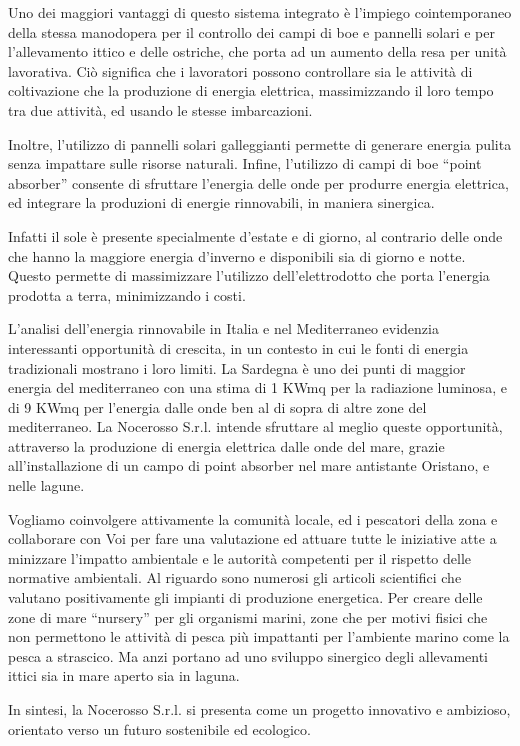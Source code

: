 \documentclass[
  onecolumn]{report}
\begin{document}
Uno dei maggiori vantaggi di questo sistema integrato è l'impiego
cointemporaneo della stessa manodopera per il controllo dei campi di boe
e pannelli solari e per l'allevamento ittico e delle ostriche, che porta
ad un aumento della resa per unità lavorativa. Ciò significa che i
lavoratori possono controllare sia le attività di coltivazione che la
produzione di energia elettrica, massimizzando il loro tempo tra due
attività, ed usando le stesse imbarcazioni.

Inoltre, l'utilizzo di pannelli solari galleggianti permette di generare
energia pulita senza impattare sulle risorse naturali. Infine,
l'utilizzo di campi di boe ``point absorber'' consente di sfruttare
l'energia delle onde per produrre energia elettrica, ed integrare la
produzioni di energie rinnovabili, in maniera sinergica.

Infatti il sole è presente specialmente d'estate e di giorno, al
contrario delle onde che hanno la maggiore energia d'inverno e
disponibili sia di giorno e notte. Questo permette di massimizzare
l'utilizzo dell'elettrodotto che porta l'energia prodotta a terra,
minimizzando i costi.

L'analisi dell'energia rinnovabile in Italia e nel Mediterraneo
evidenzia interessanti opportunità di crescita, in un contesto in cui le
fonti di energia tradizionali mostrano i loro limiti. La Sardegna è uno
dei punti di maggior energia del mediterraneo con una stima di 1 KWmq
per la radiazione luminosa, e di 9 KWmq per l'energia dalle onde ben al
di sopra di altre zone del mediterraneo. La Nocerosso S.r.l. intende
sfruttare al meglio queste opportunità, attraverso la produzione di
energia elettrica dalle onde del mare, grazie all'installazione di un
campo di point absorber nel mare antistante Oristano, e nelle lagune.

Vogliamo coinvolgere attivamente la comunità locale, ed i pescatori
della zona e collaborare con Voi per fare una valutazione ed attuare
tutte le iniziative atte a minizzare l'impatto ambientale e le autorità
competenti per il rispetto delle normative ambientali. Al riguardo sono
numerosi gli articoli scientifici che valutano positivamente gli
impianti di produzione energetica. Per creare delle zone di mare
``nursery'' per gli organismi marini, zone che per motivi fisici che non
permettono le attività di pesca più impattanti per l'ambiente marino
come la pesca a strascico. Ma anzi portano ad uno sviluppo sinergico
degli allevamenti ittici sia in mare aperto sia in laguna.

In sintesi, la Nocerosso S.r.l. si presenta come un progetto innovativo
e ambizioso, orientato verso un futuro sostenibile ed ecologico.
\end{document}
